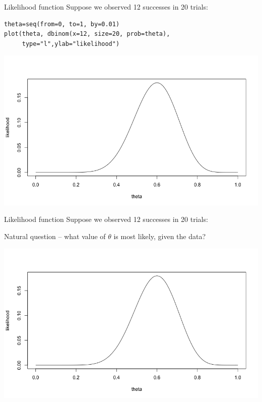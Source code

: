 \documentclass[presentation]{beamer}
\begin{document}
\begin{frame}[fragile,label=sec-5]{Likelihood function}
 Suppose we observed 12 successes in 20 trials:

\begin{verbatim}
theta=seq(from=0, to=1, by=0.01)
plot(theta, dbinom(x=12, size=20, prob=theta), 
     type="l",ylab="likelihood")
\end{verbatim}

\includegraphics[width=.9\linewidth]{figures/week2/likelihood.png}
\end{frame}


\begin{frame}[label=sec-6]{Likelihood function}
Suppose we observed 12 successes in 20 trials:

\vspace{1cm}

Natural question -- what value of $\theta$ is \alert{most likely}, given the data?

\includegraphics[width=.9\linewidth]{figures/week2/likelihood.png}
\end{frame}
\end{document}
